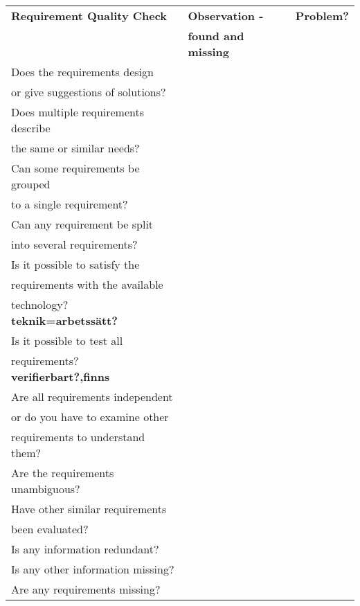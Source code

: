 \documentclass[a4paper]{article}
\begin{document}
			\begin{tabular}{|l|l|l|} \hline
		\textbf{Requirement Quality Check} & \textbf{Observation -} & \textbf{Problem?} \\
		                        & \textbf{found and missing}    &       \\ \hline	
		Does the requirements design &	& \\
		or give suggestions of solutions?	&	& \\ \hline
		Does multiple requirements describe	&	& \\
		the same or similar needs?	&	& \\ \hline
		Can some requirements be grouped	&	& \\
		to a single requirement?	&	& \\ \hline
		Can any requirement be split	&	& \\
		into several requirements?	&	& \\ \hline
		Is it possible to satisfy the	&	& \\
		requirements with the available	&	& \\
		technology? \textbf{teknik=arbetssätt?}	&	& \\ \hline
		Is it possible to test all	&	& \\
		requirements? \textbf{verifierbart?,finns}	&	& \\ \hline
		Are all requirements independent	&	& \\
		or do you have to examine other	&	& \\
		requirements to understand them?	&	& \\ \hline
		Are the requirements unambiguous?	&	& \\ \hline
		Have other similar requirements	&	& \\
		been evaluated? 	&	& \\ \hline
		Is any information redundant?	&	& \\ \hline
		Is any other information missing?	&	&	\\ \hline
		Are any requirements missing?	&	&	\\ \hline	
	\end{tabular}
\end{document}
